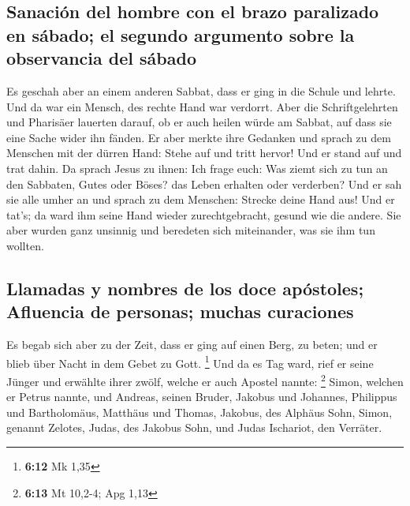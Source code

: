 \hypertarget{sanaciuxf3n-del-hombre-con-el-brazo-paralizado-en-suxe1bado-el-segundo-argumento-sobre-la-observancia-del-suxe1bado}{%
\subsection{Sanación del hombre con el brazo paralizado en sábado; el
segundo argumento sobre la observancia del
sábado}\label{sanaciuxf3n-del-hombre-con-el-brazo-paralizado-en-suxe1bado-el-segundo-argumento-sobre-la-observancia-del-suxe1bado}}

 Es geschah aber an einem anderen Sabbat, dass er ging in
die Schule und lehrte. Und da war ein Mensch, des rechte Hand war
verdorrt.  Aber die Schriftgelehrten und Pharisäer
lauerten darauf, ob er auch heilen würde am Sabbat, auf dass sie eine
Sache wider ihn fänden.  Er aber merkte ihre Gedanken und
sprach zu dem Menschen mit der dürren Hand: Stehe auf und tritt hervor!
Und er stand auf und trat dahin.  Da sprach Jesus zu
ihnen: Ich frage euch: Was ziemt sich zu tun an den Sabbaten, Gutes oder
Böses? das Leben erhalten oder verderben?  Und er sah sie
alle umher an und sprach zu dem Menschen: Strecke deine Hand aus! Und er
tat's; da ward ihm seine Hand wieder zurechtgebracht, gesund wie die
andere.  Sie aber wurden ganz unsinnig und beredeten sich
miteinander, was sie ihm tun wollten.

\hypertarget{llamadas-y-nombres-de-los-doce-apuxf3stoles-afluencia-de-personas-muchas-curaciones}{%
\subsection{Llamadas y nombres de los doce apóstoles; Afluencia de
personas; muchas
curaciones}\label{llamadas-y-nombres-de-los-doce-apuxf3stoles-afluencia-de-personas-muchas-curaciones}}

 Es begab sich aber zu der Zeit, dass er ging auf einen
Berg, zu beten; und er blieb über Nacht in dem Gebet zu Gott.
\footnote{\textbf{6:12} Mk 1,35}  Und da es Tag ward,
rief er seine Jünger und erwählte ihrer zwölf, welche er auch Apostel
nannte: \footnote{\textbf{6:13} Mt 10,2-4; Apg 1,13} 
Simon, welchen er Petrus nannte, und Andreas, seinen Bruder, Jakobus und
Johannes, Philippus und Bartholomäus,  Matthäus und
Thomas, Jakobus, des Alphäus Sohn, Simon, genannt Zelotes,
 Judas, des Jakobus Sohn, und Judas Ischariot, den
Verräter.

